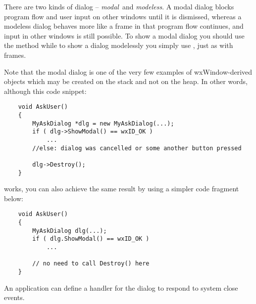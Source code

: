 

There are two kinds of dialog -- {\it modal}\ and {\it modeless}. A modal dialog
blocks program flow and user input on other windows until it is dismissed,
whereas a modeless dialog behaves more like a frame in that program flow
continues, and input in other windows is still possible. To show a modal dialog
you should use the  method while to show
a dialog modelessly you simply use , just as with
frames.

Note that the modal dialog is one of the very few examples of
wxWindow-derived objects which may be created on the stack and not on the heap.
In other words, although this code snippet:

\begin{verbatim}
    void AskUser()
    {
        MyAskDialog *dlg = new MyAskDialog(...);
        if ( dlg->ShowModal() == wxID_OK )
            ...
        //else: dialog was cancelled or some another button pressed

        dlg->Destroy();
    }
\end{verbatim}

works, you can also achieve the same result by using a simpler code fragment
below:

\begin{verbatim}
    void AskUser()
    {
        MyAskDialog dlg(...);
        if ( dlg.ShowModal() == wxID_OK )
            ...

        // no need to call Destroy() here
    }
\end{verbatim}

An application can define a  handler for
the dialog to respond to system close events.



